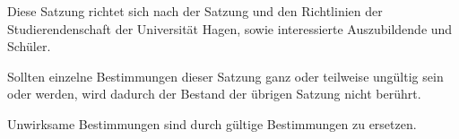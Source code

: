 \begin{contract}

Diese Satzung richtet sich nach der Satzung und den Richtlinien der Studierendenschaft der Universität Hagen, sowie interessierte Auszubildende und Schüler.

Sollten einzelne Bestimmungen dieser Satzung ganz oder teilweise ungültig sein oder werden, wird dadurch der Bestand der übrigen Satzung nicht berührt.

Unwirksame Bestimmungen sind durch gültige Bestimmungen zu ersetzen.



\end{contract}
